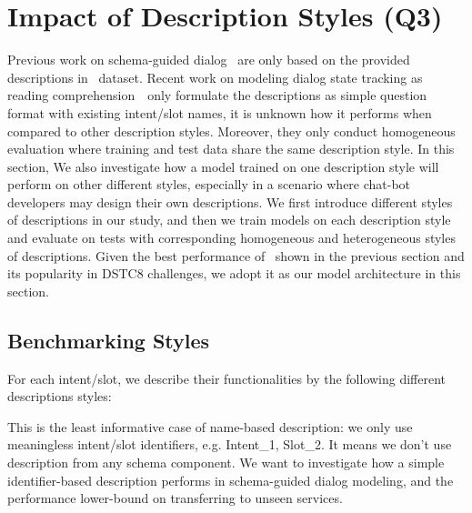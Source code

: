 \section{Impact of Description Styles (Q3)}
\label{sec:sgd:abl-desc}
Previous work on schema-guided dialog~\cite{rastogi2020schema} are
only based on the provided descriptions in \sgdst~dataset. Recent work
on modeling dialog state tracking as reading
comprehension~\cite{gao2019dialog}~only formulate the descriptions as
simple question format with existing intent/slot names, it is unknown
how it performs when compared to other description styles. Moreover,
they only conduct homogeneous evaluation where training and test data
share the same description style. In this section, We also investigate
how a model trained on one description style will perform on other
different styles, especially in a scenario where chat-bot developers
may design their own descriptions. We first introduce different styles
of descriptions in our study, and then we train models on each
description style and evaluate on tests with corresponding homogeneous
and heterogeneous styles of descriptions. Given the best performance
of \CE~shown in the previous section and its popularity in DSTC8
challenges, we adopt it as our model architecture in this section.

\subsection{Benchmarking Styles}
\label{ssec:desc-styles}
For each intent/slot, we describe their functionalities by the
following different descriptions styles:

\Paragraph{\ID} This is the least informative case of name-based
description: we only use meaningless intent/slot identifiers,
e.g. Intent\_1, Slot\_2. It means we don't use description from any
schema component. We want to investigate how a simple identifier-based
description performs in schema-guided dialog modeling, and the
performance lower-bound on transferring to unseen services.

